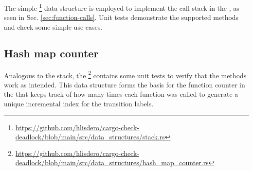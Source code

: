 The simple
\footnote{\url{https://github.com/hlisdero/cargo-check-deadlock/blob/main/src/data_structures/stack.rs}}
data structure is employed to implement the call stack in the ,
as seen in Sec. \ref{sec:function-calls}.
Unit tests demonstrate the supported methods and check some simple use cases.

\subsection{Hash map counter}

Analogous to the stack,
the \footnote{\url{https://github.com/hlisdero/cargo-check-deadlock/blob/main/src/data_structures/hash_map_counter.rs}}
contains some unit tests to verify that the methods work as intended.
This data structure forms the basis for the function counter in the 
that keeps track of how many times each function was called
to generate a unique incremental index for the transition labels.
